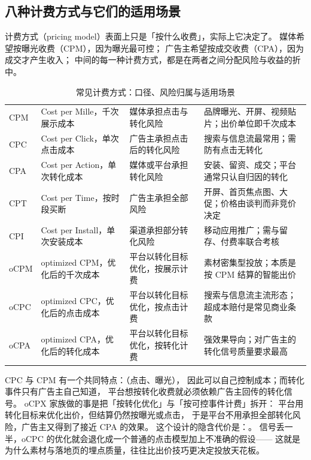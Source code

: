 \subsection{八种计费方式与它们的适用场景}

计费方式（pricing model）表面上只是「按什么收费」，实际上它决定了。
媒体希望按曝光收费（CPM），因为曝光最可控；
广告主希望按成交收费（CPA），因为成交才产生收入；
中间的每一种计费方式，都是在两者之间分配风险与收益的折中。

\begin{table}[htbp]
\centering
\caption{常见计费方式：口径、风险归属与适用场景}
\label{tab:pricing-models}
\small
\begin{tabularx}{\textwidth}{L{1.6cm} L{3.4cm} L{2.4cm} Y}
\toprule
{} &  &  &  \\
\midrule
CPM & Cost per Mille，千次展示成本 & 媒体承担点击与转化风险 & 品牌曝光、开屏、视频贴片；出价单位即千次成本 \\
\addlinespace
CPC & Cost per Click，单次点击成本 & 广告主承担点击后的转化风险 & 搜索与信息流最常用；需防有点击无转化 \\
\addlinespace
CPA & Cost per Action，单次转化成本 & 媒体或平台承担转化风险 & 安装、留资、成交；平台通常只认自归因的转化 \\
\addlinespace
CPT & Cost per Time，按时段买断 & 广告主承担全部风险 & 开屏、首页焦点图、大促；价格由谈判而非竞价决定 \\
\addlinespace
CPI & Cost per Install，单次安装成本 & 渠道承担部分转化风险 & 移动应用推广；需与留存、付费率联合考核 \\
\addlinespace
oCPM & optimized CPM，优化后的千次成本 & 平台以转化目标优化，按展示计费 & 素材密集型投放；本质是按 CPM 结算的智能出价 \\
\addlinespace
oCPC & optimized CPC，优化后的点击成本 & 平台以转化目标优化，按点击计费 & 搜索与信息流主流形态；超成本赔付是常见商业条款 \\
\addlinespace
oCPA & optimized CPA，优化后的转化成本 & 平台以转化目标优化，按转化计费 & 强效果导向；对广告主的转化信号质量要求最高 \\
\bottomrule
\end{tabularx}
\end{table}

\begin{insight}
CPC 与 CPM 有一个共同特点：（点击、曝光），
因此可以自己控制成本；而转化事件只有广告主自己知道，
平台想按转化收费就必须依赖广告主回传的转化信号。
oCPX 家族做的事是把「按转化优化」与「按可控事件计费」拆开：
平台用转化目标来优化出价，但结算仍然按曝光或点击，
于是平台不用承担全部转化风险，广告主又得到了接近 CPA 的效果。
这个设计的隐含代价是：。
信号丢一半，oCPC 的优化就会退化成一个普通的点击模型加上不准确的假设——
这就是为什么素材与落地页的埋点质量，往往比出价技巧更决定投放天花板。
\end{insight}

